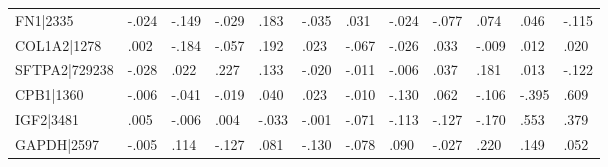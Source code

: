 \begin{table}[h]
\begin{tabular}{llllllllllll}
FN1|2335                        & -.024                            & -.149                            & -.029                            & .183                             & -.035                            & .031                             & -.024                            & -.077                            & .074                             & .046                              & -.115                             \\
COL1A2|1278                     & .002                             & -.184                            & -.057                            & .192                             & .023                             & -.067                            & -.026                            & .033                             & -.009                            & .012                              & .020                              \\
SFTPA2|729238                   & -.028                            & .022                             & .227                             & .133                             & -.020                            & -.011                            & -.006                            & .037                             & .181                             & .013                              & -.122                             \\
CPB1|1360                       & -.006                            & -.041                            & -.019                            & .040                             & .023                             & -.010                            & -.130                            & .062                             & -.106                            & -.395                             & .609                              \\
IGF2|3481                       & .005                             & -.006                            & .004                             & -.033                            & -.001                            & -.071                            & -.113                            & -.127                            & -.170                            & .553                              & .379                              \\
GAPDH|2597                      & -.005                            & .114                             & -.127                            & .081                             & -.130                            & -.078                            & .090                             & -.027                            & .220                             & .149                              & .052                              \\

\end{tabular}
\end{table}
